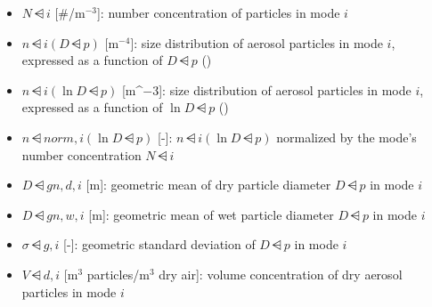 \begin{itemize}

  \item $N\dsub{i}$ [#/m$^{-3}$]: number concentration of particles in mode $i$

  \item $n\dsub{i} (D\dsub{p})$ [m$^{-4}$]: size distribution of aerosol
        particles in mode $i$, expressed as a function of $D\dsub{p}$
        ()

  \item $n\dsub{i} (\ln D\dsub{p})$ [m^${-3}$]: size distribution of aerosol
        particles in mode $i$, expressed as a function of $\ln D\dsub{p}$
        ()

  \item $n\dsub{norm,i} (\ln D\dsub{p})$ [-]: $n\dsub{i} (\ln D\dsub{p})$
        normalized by the mode's number concentration $N\dsub{i}$

  \item $D\dsub{gn,d,i}$ [m]: geometric mean of dry particle diameter
        $D\dsub{p}$ in mode $i$

  \item $D\dsub{gn,w,i}$ [m]: geometric mean of wet particle diameter
        $D\dsub{p}$ in mode $i$

  \item $\sigma\dsub{g,i}$ [-]: geometric standard deviation of $D\dsub{p}$ in
        mode $i$

  \item $V\dsub{d,i}$ [m$^3$ particles/m$^3$ dry air]: volume concentration of
        dry aerosol particles in mode $i$


\end{itemize}
